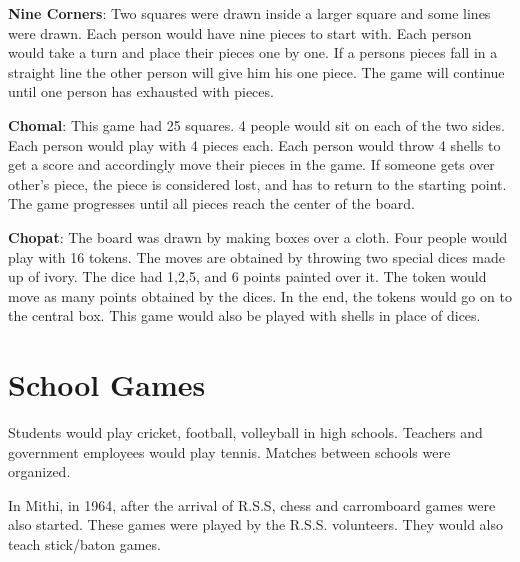 \textbf{Nine Corners}: Two squares were drawn inside a larger square and some
lines were drawn. Each person would have nine pieces to start with.  Each
person would take a turn and place their pieces one by one. If a persons pieces
fall in a straight line the other person will give him his one piece. The game
will continue until one person has exhausted with pieces.

\textbf{Chomal}: This game had 25 squares. 4 people would sit on each of the
two sides. Each person would play with 4 pieces each. Each person would throw 4
shells to get a score and accordingly move their pieces in the game. If someone
gets over other's piece, the piece is considered lost, and has to return to the
starting point. The game progresses until all pieces reach the center of the
board.

\textbf{Chopat}: The board was drawn by making boxes over a cloth. Four people
would play with 16 tokens. The moves are obtained by throwing two special dices
made up of ivory. The dice had 1,2,5, and 6 points painted over it. The token
would move as many points obtained by the dices. In the end, the tokens would
go on to the central box. This game would also be played with shells in place
of dices.

\section{School Games}

Students would play cricket, football, volleyball in high schools. Teachers
and government employees would play tennis. Matches between schools were
organized.

In Mithi, in 1964, after the arrival of R.S.S, chess and carromboard games were
also started. These games were played by the R.S.S. volunteers. They would also
teach stick/baton games.

